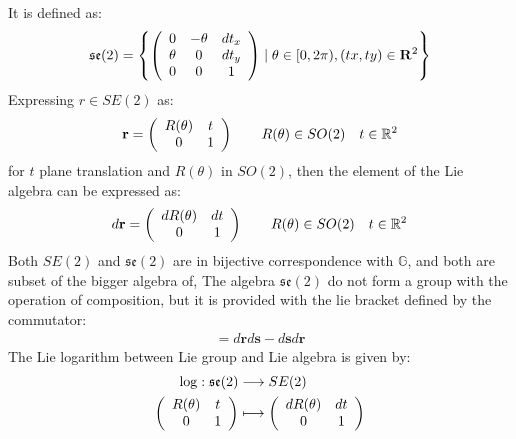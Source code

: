 It is defined as:
\begin{align*}
	\mathfrak{se}(2) = 
	\left \{
	\left (
	\begin{array} {c c c }
		0 & -\theta &  dt_{x} \\
		\theta & 0 & dt_{y} \\
		0& 0 & 1
	\end{array}
	\right )
	\mid
	\theta \in  [0, 2\pi), (tx, ty) \in\mathbf{R}^2
	\right \}
\end{align*}
Expressing $r\in SE(2)$ as:
\begin{align*}
\mathbf{r} = 
\left (
\begin{array} {c c }
R(\theta) & t \\
0 & 1 
\end{array}
\right )
\qquad
R(\theta) \in SO(2) 
\quad
t \in \mathbb{R}^{2}
\end{align*}
for $t$ plane translation and $R(\theta)$ in $SO(2)$, then the element of the Lie algebra can be expressed as:
\begin{align*}
d\mathbf{r} 
= 
\left (
\begin{array} {c c }
dR(\theta) & dt \\
0 & 1 
\end{array}
\right )
\qquad
R(\theta) \in SO(2) 
\quad
t \in \mathbb{R}^{2}
\end{align*}
Both $SE(2)$ and $\mathfrak{se}(2)$ are in bijective correspondence with $\mathbb{G}$, and both are subset of the bigger algebra of, The algebra $\mathfrak{se}(2)$ do not form a group with the operation of composition, but it is provided with the lie bracket defined by the commutator:
\begin{align*}
[d\mathbf{r}, d\mathbf{s}] = d\mathbf{r} d\mathbf{s} - d\mathbf{s} d\mathbf{r}
\end{align*}
The Lie logarithm between Lie group and Lie algebra is given by:
\begin{align*}
\log : \mathfrak{se}(2) & \longrightarrow SE(2)
\\
\left (
\begin{array} {c c }
R(\theta) & t \\
0 & 1 
\end{array}
\right )
&\longmapsto  
\left (
\begin{array} {c c }
dR(\theta) & dt \\
0 & 1 
\end{array}
\right )
\end{align*}
